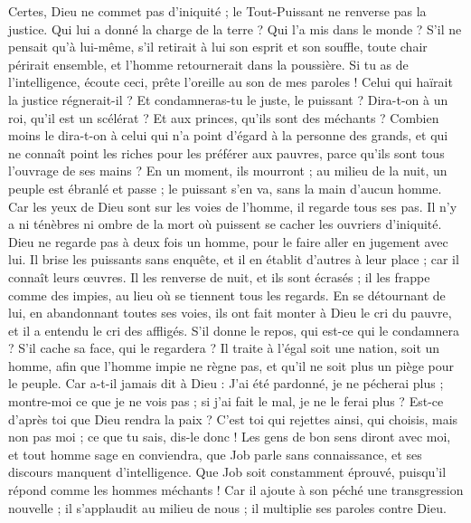 \begin{multicols}{2}
Certes, Dieu ne commet pas d'iniquité ; le Tout-Puissant ne renverse pas la justice.
Qui lui a donné la charge de la terre ? Qui l'a mis dans le monde ?
S'il ne pensait qu'à lui-même, s'il retirait à lui son esprit et son souffle,
toute chair périrait ensemble, et l'homme retournerait dans la poussière.
Si tu as de l'intelligence, écoute ceci, prête l'oreille au son de mes paroles !
Celui qui haïrait la justice régnerait-il ? Et condamneras-tu le juste, le puissant ?
Dira-t-on à un roi, qu'il est un scélérat ? Et aux princes, qu'ils sont des méchants ?
Combien moins le dira-t-on à celui qui n'a point d'égard à la personne des grands, et qui ne connaît point les riches pour les préférer aux pauvres, parce qu'ils sont tous l'ouvrage de ses mains ?
En un moment, ils mourront ; au milieu de la nuit, un peuple est ébranlé et passe ; le puissant s'en va, sans la main d'aucun homme.
Car les yeux de Dieu sont sur les voies de l'homme, il regarde tous ses pas.
Il n'y a ni ténèbres ni ombre de la mort où puissent se cacher les ouvriers d'iniquité.
Dieu ne regarde pas à deux fois un homme, pour le faire aller en jugement avec lui.
Il brise les puissants sans enquête, et il en établit d'autres à leur place ;
car il connaît leurs œuvres. Il les renverse de nuit, et ils sont écrasés ;
il les frappe comme des impies, au lieu où se tiennent tous les regards.
En se détournant de lui, en abandonnant toutes ses voies,
ils ont fait monter à Dieu le cri du pauvre, et il a entendu le cri des affligés.
S'il donne le repos, qui est-ce qui le condamnera ? S'il cache sa face, qui le regardera ? Il traite à l'égal soit une nation, soit un homme,
afin que l'homme impie ne règne pas, et qu'il ne soit plus un piège pour le peuple.
Car a-t-il jamais dit à Dieu : J'ai été pardonné, je ne pécherai plus ;
montre-moi ce que je ne vois pas ; si j'ai fait le mal, je ne le ferai plus ?
Est-ce d'après toi que Dieu rendra la paix ? C'est toi qui rejettes ainsi, qui choisis, mais non pas moi ; ce que tu sais, dis-le donc !
Les gens de bon sens diront avec moi, et tout homme sage en conviendra,
que Job parle sans connaissance, et ses discours manquent d'intelligence.
Que Job soit constamment éprouvé, puisqu'il répond comme les hommes méchants !
Car il ajoute à son péché une transgression nouvelle ; il s'applaudit au milieu de nous ; il multiplie ses paroles contre Dieu.

\end{multicols}
